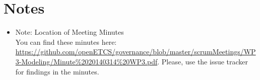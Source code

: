 \documentclass[a4paper, 11pt]{article}
\begin{document}
\section{Notes}
\begin{itemize}

\item Note: Location of Meeting Minutes\\
You can find these minutes here: \url{https://github.com/openETCS/governance/blob/master/scrumMeetings/WP3-Modeling/Minute%2020140314%20WP3.pdf}. Please, use the issue tracker for findings in the minutes.
\end{itemize}
\end{document}
